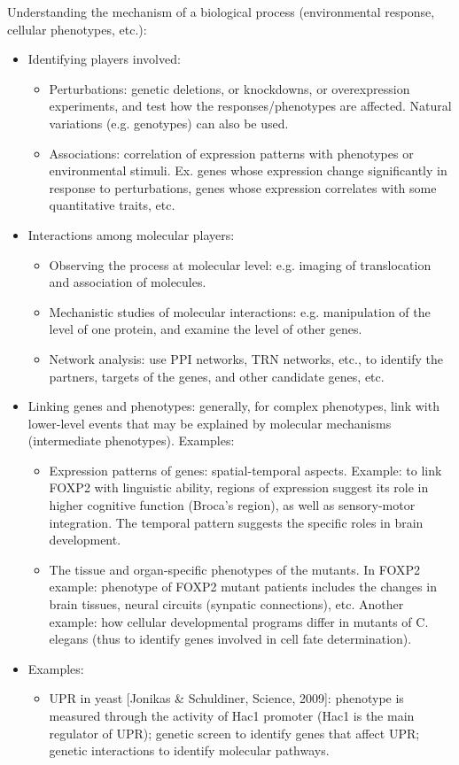 \documentclass{report}
\begin{document}
Understanding the mechanism of a biological process (environmental response, cellular phenotypes, etc.): 
\begin{itemize}
\item Identifying players involved: 
\begin{itemize}
	\item Perturbations: genetic deletions, or knockdowns, or overexpression experiments, and test how the responses/phenotypes are affected. Natural variations (e.g. genotypes) can also be used. 
	\item Associations: correlation of expression patterns with phenotypes or environmental stimuli. Ex. genes whose expression change significantly in response to perturbations, genes whose expression correlates with some quantitative traits, etc. 
\end{itemize}

\item Interactions among molecular players: 
\begin{itemize}
	\item Observing the process at molecular level: e.g. imaging of translocation and association of molecules. 
	\item Mechanistic studies of molecular interactions: e.g. manipulation of the level of one protein, and examine the level of other genes. 
	\item Network analysis: use PPI networks, TRN networks, etc., to identify the partners, targets of the genes, and other candidate genes, etc.  
\end{itemize}

\item Linking genes and phenotypes: generally, for complex phenotypes, link with lower-level events that may be explained by molecular mechanisms (intermediate phenotypes). Examples: 
\begin{itemize}
	\item Expression patterns of genes: spatial-temporal aspects. Example: to link FOXP2 with linguistic ability, regions of expression suggest its role in higher cognitive function (Broca's region), as well as sensory-motor integration. The temporal pattern suggests the specific roles in brain development.
	\item The tissue and organ-specific phenotypes of the mutants. In FOXP2 example: phenotype of FOXP2 mutant patients includes the changes in brain tissues, neural circuits (synpatic connections), etc. Another example: how cellular developmental programs differ in mutants of C. elegans (thus to identify genes involved in cell fate determination). 
\end{itemize}

\item Examples: 
\begin{itemize}
	\item UPR in yeast [Jonikas \& Schuldiner, Science, 2009]: phenotype is measured through the activity of Hac1 promoter (Hac1 is the main regulator of UPR); genetic screen to identify genes that affect UPR; genetic interactions to identify molecular pathways. 
\end{itemize}
\end{itemize}
\end{document}
